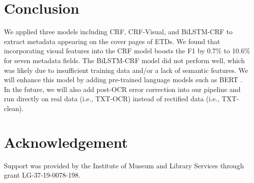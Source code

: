 \documentclass{article}
\begin{document}
\section{Conclusion}
We applied three models including CRF, CRF-Visual, and BiLSTM-CRF to extract metadata appearing on the cover pages of ETDs. We found that incorporating visual features into the CRF model boosts the F1 by 0.7\% to 10.6\% for seven metadata fields. The BiLSTM-CRF model did not perform well, which was likely due to insufficient training data and/or a lack of semantic features. We will enhance this model by adding pre-trained language models such as BERT \cite{bert}. In the future, we will also add post-OCR error correction into our pipeline and run directly on real data (i.e., TXT-OCR) instead of rectified data (i.e., TXT-clean). 

\section*{Acknowledgement}
Support was provided by the Institute of Museum and Library Services through grant LG-37-19-0078-198.


  
\end{document}
